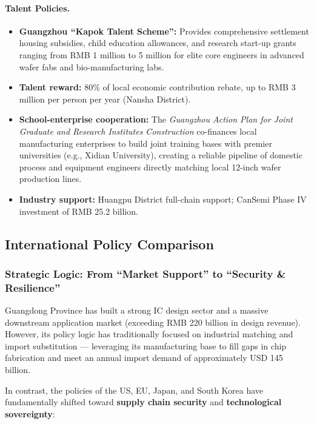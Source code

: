 \documentclass[12pt,a4paper]{article}
\begin{document}
\paragraph{Talent Policies.}
\begin{itemize}
    \item \textbf{Guangzhou ``Kapok Talent Scheme'':} Provides
          comprehensive settlement housing subsidies, child education
          allowances, and research start-up grants ranging from RMB 1
          million to 5 million for elite core engineers in advanced wafer
          fabs and bio-manufacturing labs.
    \item \textbf{Talent reward:} 80\% of local economic contribution
          rebate, up to RMB 3 million per person per year (Nansha
          District).
    \item \textbf{School-enterprise cooperation:} The \textit{Guangzhou
          Action Plan for Joint Graduate and Research Institutes
          Construction} co-finances local manufacturing enterprises to
          build joint training bases with premier universities (e.g.,
          Xidian University), creating a reliable pipeline of domestic
          process and equipment engineers directly matching local 12-inch
          wafer production lines.
    \item \textbf{Industry support:} Huangpu District full-chain support;
          CanSemi Phase IV investment of RMB 25.2 billion.
\end{itemize}

\subsection{International Policy Comparison}
\label{sec:policy_comparison}

\subsubsection{Strategic Logic: From ``Market Support'' to ``Security
\& Resilience''}

Guangdong Province has built a strong IC design sector and a massive
downstream application market (exceeding RMB 220 billion in design
revenue). However, its policy logic has traditionally focused on
industrial matching and import substitution — leveraging its
manufacturing base to fill gaps in chip fabrication and meet an annual
import demand of approximately USD 145 billion.

In contrast, the policies of the US, EU, Japan, and South Korea have
fundamentally shifted toward \textbf{supply chain security} and
\textbf{technological sovereignty}:
\end{document}
